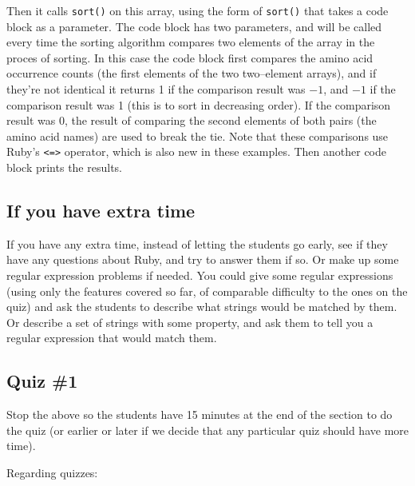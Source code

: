 \documentclass[12pt]{article}
\begin{document}
        \medskip\smallskip
  
        Then it calls \texttt{sort()} on this array, using the form of
      \texttt{sort()} that takes a code block as a parameter.  The code
      block has two parameters, and will be called every time the sorting
      algorithm compares two elements of the array in the proces of sorting.
      In this case the code block first compares the amino acid occurrence
      counts (the first elements of the two two--element arrays), and if
      they're not identical it returns 1 if the comparison result was $-1$,
      and $-1$ if the comparison result was 1 (this is to sort in decreasing
      order).  If the comparison result was 0, the result of comparing the
      second elements of both pairs (the amino acid names) are used to break
      the tie.  Note that these comparisons use Ruby's \texttt{<=>}
      operator, which is also new in these examples.  Then another code
      block prints the results.
  
    \subsection{If you have extra time}
  
      If you have any extra time, instead of letting the students go early,
    see if they have any questions about Ruby, and try to answer them if so.
    Or make up some regular expression problems if needed.  You could give
    some regular expressions (using only the features covered so far, of
    comparable difficulty to the ones on the quiz) and ask the students to
    describe what strings would be matched by them.  Or describe a set of
    strings with some property, and ask them to tell you a regular
    expression that would match them.
  
    \subsection{Quiz \#1}
  
      Stop the above so the students have 15 minutes at the end of the section
    to do the quiz (or earlier or later if we decide that any particular
    quiz should have more time).
  
      Regarding quizzes:
  
      \vspace{-1.5mm}
  
\end{document}
